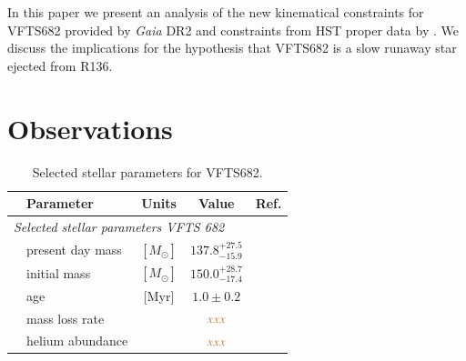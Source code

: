 \documentclass[apjl,twocolumn]{emulateapj}
\newcommand{\SdM}[1]{{{\color{brown}{#1}}}}
\begin{document}

In this paper we present an analysis of the new kinematical
constraints for VFTS682 provided by \emph{Gaia} DR2 and constraints
from HST proper data  by \citet{platais:18}.   We discuss the
implications for the hypothesis that VFTS682 is a slow runaway star
ejected from R136.




\section{Observations}
\label{sec:sample}


\begin{table}
  \begin{center}
    \caption{Selected stellar parameters for VFTS682. }
    \begin{tabular}{llc|c|c}
      \hline
      \hline
      &Parameter & Units & Value & Ref.\\
     
       \hline
       \multicolumn{5}{l}{\emph{Selected stellar parameters VFTS 682}} \\
     & present day mass  & $[M_\odot]$ & $137.8^{+27.5}_
                                           {-15.9}$ &
                                                    \\
      & initial mass& $[M_\odot]$ & $150.0^{+28.7}_{-17.4}$ &
      \\
      &age & [Myr] & $1.0\pm0.2$ & \\
      &mass loss rate &  & $\SdM{xxx}$ & \\
      &helium abundance &  & $\SdM{xxx}$ & \\
      \hline

    \end{tabular}
    \tablecomments
    { 
    }
  \end{center}
  \label{tab:star}
\end{table}
\end{document}
